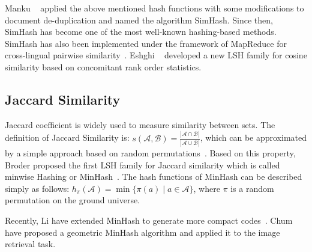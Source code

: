 
Manku \etal~\cite{manku2007www} applied the above mentioned hash functions with some modifications to document de-duplication and named the algorithm \mbox{SimHash}. Since then, \mbox{SimHash} has become one of the most well-known hashing-based methods. \mbox{SimHash} has also been implemented under the framework of \mbox{MapReduce} for cross-lingual pairwise similarity~\cite{ture2011sigir}. Eshghi \etal~\cite{eshghi2008kdd} developed a new \mbox{LSH} family for cosine similarity based on concomitant rank order statistics. 

%
%

\subsection{Jaccard Similarity}
Jaccard coefficient is widely used to measure similarity between sets. The definition of Jaccard Similarity is: $s(\mathcal{A},\mathcal{B}) = \frac{|\mathcal{A}\cap \mathcal{B}|}{|\mathcal{A}\cup \mathcal{B}|}$, which can be approximated by a simple approach based on random permutations~\cite{broder1997ccs,broder1997www}. Based on this property, Broder \etal proposed the first \mbox{LSH} family for Jaccard similarity which is called minwise Hashing or \mbox{MinHash}~\cite{broder1998stoc}. The hash functions of \mbox{MinHash} can be described simply as follows: $h_{\pi}(\mathcal{A}) = \min\{\pi(a)\mid a\in \mathcal{A}\}$, where $\pi$ is a random permutation on the ground universe. %


Recently, Li \etal have extended \mbox{MinHash} to generate more compact codes~\cite{li2010www,li2010nips}. Chum \etal~\cite{chum2009cvpr} have proposed a geometric \mbox{MinHash} algorithm and applied it to the image retrieval task. %


